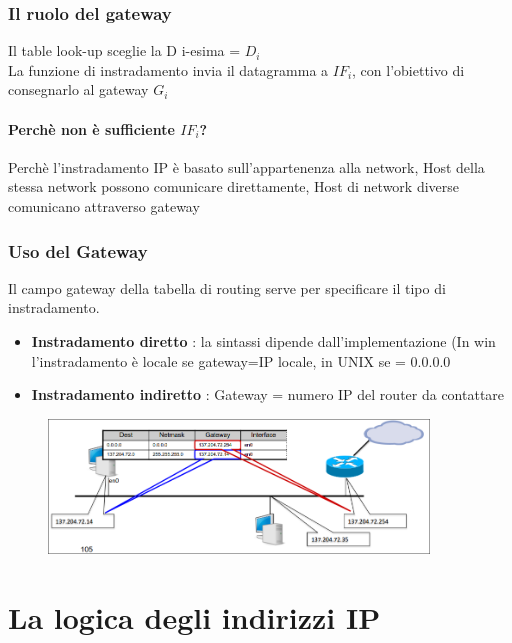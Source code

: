 \documentclass{report}
\begin{document}
            \subsection{Il ruolo del gateway}
                Il table look-up sceglie la D i-esima = $D_i$
                \\
                La funzione di instradamento invia il datagramma a $IF_i$, con l'obiettivo di consegnarlo al gateway $G_i$
                \subsubsection{Perchè non è sufficiente $IF_i$?}
                    Perchè l'instradamento IP è basato sull'appartenenza alla network, Host della stessa network possono comunicare direttamente, Host di network diverse comunicano attraverso gateway
            \subsection{Uso del Gateway}
                Il campo gateway della tabella di routing serve per specificare il tipo di instradamento.
                \begin{itemize}
                    \item \textbf{Instradamento diretto} : la sintassi dipende dall'implementazione (In win l'instradamento è locale se gateway=IP locale, in UNIX se = 0.0.0.0
                    \item \textbf{Instradamento indiretto} : Gateway = numero IP del router da contattare 
                \end{itemize}
               \begin{figure}[H]
                    \includegraphics[width=0.9\textwidth]{1/uG.png}
                \end{figure}
    \chapter{La logica degli indirizzi IP}
\end{document}
